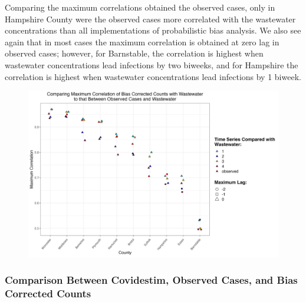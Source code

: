 \documentclass[12pt,twoside]{smiththesis}
\begin{document}
Comparing the maximum correlations obtained the observed cases, only in Hampshire County were the observed cases more correlated with the wastewater concentrations than all implementations of probabilistic bias analysis. We also see again that in most cases the maximum correlation is obtained at zero lag in observed cases; however, for Barnstable, the correlation is highest when wastewater concentrations lead infections by two biweeks, and for Hampshire the correlation is highest when wastewater concentrations lead infections by 1 biweek.
\begin{figure}
\includegraphics[width=1\linewidth]{figure/correlation_observed_pb} \caption{\label{fig:correlation_observed_pb}}\label{fig:unnamed-chunk-21}
\end{figure}
\hypertarget{comparison-between-covidestim-observed-cases-and-bias-corrected-counts}{%
\subsubsection{Comparison Between Covidestim, Observed Cases, and Bias Corrected Counts}\label{comparison-between-covidestim-observed-cases-and-bias-corrected-counts}}
\end{document}
